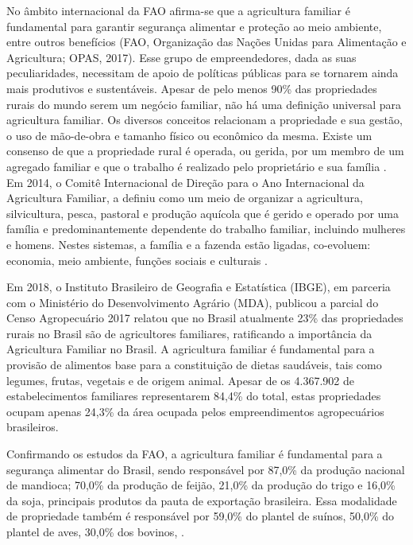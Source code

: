 No âmbito internacional da FAO afirma-se que a agricultura familiar é fundamental para garantir segurança alimentar e proteção ao meio ambiente, entre outros benefícios (FAO, Organização das Nações Unidas para Alimentação e Agricultura; OPAS, 2017). Esse grupo de empreendedores, dada as suas peculiaridades, necessitam de apoio de políticas públicas para se tornarem ainda mais produtivos e sustentáveis. Apesar de pelo menos 90\% das propriedades rurais do mundo serem um negócio familiar, não há uma definição universal para agricultura familiar. Os diversos conceitos relacionam a propriedade e sua gestão, o uso de mão-de-obra e tamanho físico ou econômico da mesma. Existe um consenso de que a propriedade rural é operada, ou gerida, por um membro de um agregado familiar e que o trabalho é realizado pelo proprietário e sua família \cite{schneider_teoria_2003}. Em 2014, o Comitê Internacional de Direção para o Ano Internacional da Agricultura Familiar, a definiu como um meio de organizar a agricultura, silvicultura, pesca, pastoral e produção aquícola que é gerido e operado por uma família e predominantemente dependente do trabalho familiar, incluindo mulheres e homens. Nestes sistemas, a família e a fazenda estão ligadas, co-evoluem: economia, meio ambiente, funções sociais e culturais \cite{fao_innovation_2014}.

Em 2018, o Instituto Brasileiro de Geografia e Estatística (IBGE), em parceria com o Ministério do Desenvolvimento Agrário (MDA), publicou a parcial do Censo Agropecuário 2017 \cite{ibge_censo_2018} relatou que no Brasil atualmente 23\% das propriedades rurais no Brasil são de agricultores familiares, ratificando a importância da Agricultura Familiar no Brasil. A agricultura familiar é fundamental para a provisão de alimentos base para a constituição de dietas saudáveis, tais como legumes, frutas, vegetais e de origem animal. Apesar de os 4.367.902 de estabelecimentos familiares representarem 84,4\% do total, estas propriedades ocupam apenas 24,3\% da área ocupada pelos empreendimentos agropecuários brasileiros. 

Confirmando os estudos da FAO, a agricultura familiar é fundamental para a  segurança alimentar do Brasil, sendo responsável por 87,0\% da produção nacional de mandioca; 70,0\% da produção de feijão, 21,0\% da produção do trigo e 16,0\% da soja, principais produtos da pauta de exportação brasileira. Essa modalidade de propriedade também é responsável por 59,0\% do plantel de suínos, 50,0\% do plantel de aves, 30,0\% dos bovinos, \cite{ibge_censo_2018}.


